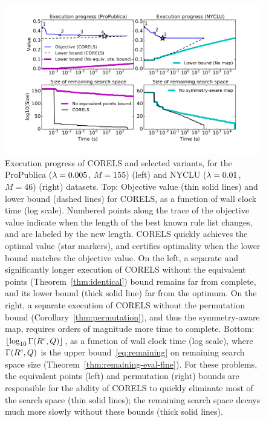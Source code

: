 \begin{figure}[t!]
\begin{center}
\includegraphics[trim={25mm, 20mm, 30mm, 10mm},
width=\textwidth]{figs/weapon_execution-remaining-space.pdf}
\end{center}
\caption{Execution progress of CORELS and selected variants,
for the ProPublica (${{\lambda} = 0.005}$, ${M = 155}$) (left)
and NYCLU (${{\lambda} = 0.01}$, ${M = 46}$) (right) datasets.
%
Top: Objective value (thin solid lines) and lower bound (dashed lines) for CORELS,
as a function of wall clock time (log scale).
%
Numbered points along the trace of the objective value
indicate when the length of the best known rule list changes,
and are labeled by the new length.
%
CORELS quickly achieves the optimal value (star markers),
and certifies optimality when the lower bound matches the objective value.
%
On the left, a separate and significantly longer execution of CORELS
without the equivalent points  (Theorem~\ref{thm:identical}) bound remains
far from complete, and its lower bound (thick solid line) far from the optimum.
%
On the right, a separate execution of CORELS without the permutation bound
(Corollary~\ref{thm:permutation}), and thus the symmetry-aware map,
requires orders of magnitude more time to complete.
%
Bottom: $\lfloor \log_{10} \Gamma({R^c}, Q) \rfloor$,
as a function of wall clock time (log scale),
where~$\Gamma({R^c}, Q)$
is the upper bound~\eqref{eq:remaining} on remaining search space size
(Theorem~\ref{thm:remaining-eval-fine}).
%
For these problems, the equivalent points (left) and
permutation (right) bounds are responsible for the ability of
CORELS to quickly eliminate most of the search space (thin solid lines);
the remaining search space decays much more slowly without these bounds (thick solid lines).
}
\label{fig:objective}
\end{figure}

